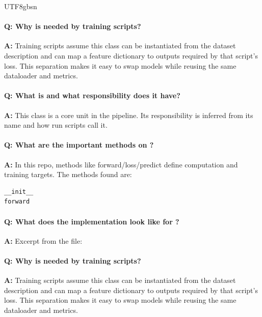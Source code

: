 \documentclass[11pt]{article}
\begin{document}
\begin{CJK*}{UTF8}{gbsn}
\paragraph{Q: Why is \texttt{} needed by training scripts?}
\textbf{A:} Training scripts assume this class can be instantiated from the dataset description and can map a feature dictionary to outputs required by that script's loss. This separation makes it easy to swap models while reusing the same dataloader and metrics.

\paragraph{Q: What is \texttt{} and what responsibility does it have?}
\textbf{A:} This class is a core unit in the pipeline. Its responsibility is inferred from its name and how run scripts call it.

\paragraph{Q: What are the important methods on \texttt{}?}
\textbf{A:} In this repo, methods like forward/loss/predict define computation and training targets. The methods found are:

\begin{Verbatim}[fontsize=\small]
__init__
forward
\end{Verbatim}

\paragraph{Q: What does the implementation look like for \texttt{}?}
\textbf{A:} Excerpt from the file:

\vspace{1mm}


\paragraph{Q: Why is \texttt{} needed by training scripts?}
\textbf{A:} Training scripts assume this class can be instantiated from the dataset description and can map a feature dictionary to outputs required by that script's loss. This separation makes it easy to swap models while reusing the same dataloader and metrics.


\end{CJK*}
\end{document}
